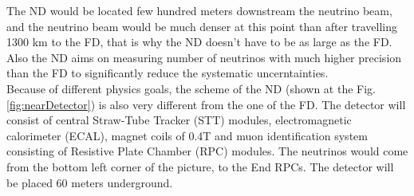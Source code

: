 The ND would be located few hundred meters downstream the neutrino beam, and the neutrino beam would be much denser at this point than after travelling 1300 km to the FD, that is why the ND doesn't have to be as large as the FD. Also the ND aims on measuring number of neutrinos with much higher precision than the FD to significantly reduce the systematic uncerntainties.\\  

Because of different physics goals, the scheme of the ND (shown at the Fig. \ref{fig:nearDetector}) is also very different from the one of the FD. The detector will consist of central Straw-Tube Tracker (STT) modules, electromagnetic calorimeter (ECAL), magnet coils of 0.4T and muon identification system consisting of Resistive Plate Chamber (RPC) modules. The neutrinos would come from the bottom left corner of the picture, to the End RPCs. The detector will be placed 60 meters underground.




